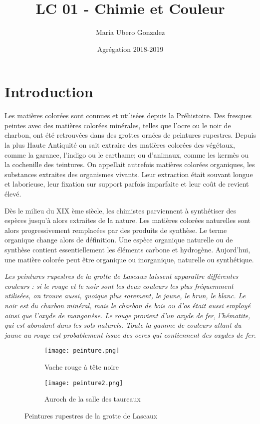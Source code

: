 \documentclass{article}
\title{LC 01 - Chimie et Couleur}
\author{Maria Ubero Gonzalez}
\date{Agrégation 2018-2019}
\begin{document}
\maketitle

\tableofcontents

\pagebreak

\section*{Introduction}
Les matières colorées sont connues et utilisées depuis la Préhistoire. Des fresques peintes avec des matières colorées minérales, telles que l'ocre ou le noir de charbon, ont été retrouvées dans des grottes ornées de peintures rupestres. Depuis la plus Haute Antiquité on sait extraire des matières colorées des végétaux, comme la garance, l'indigo ou le carthame; ou d'animaux, comme les kermès ou la cochenille des teintures. On appellait autrefois matières colorées organiques, les substances extraites des organismes vivants. Leur extraction était souvant longue et laborieuse, leur fixation sur support parfois imparfaite et leur coût de revient élevé.\smallskip

Dès le milieu du XIX ème siècle, les chimistes parviennent à synthétiser des espèces jusqu'à alors extraites de la nature. Les matières colorées naturelles sont alors progressivement remplacées par des produits de synthèse. Le terme organique change alors de définition. Une espèce organique naturelle ou de synthèse contient essentiellement les éléments carbone et hydrogène. Aujord'hui, une matière colorée peut être organique ou inorganique, naturelle ou synthétique.\medskip

\textit{Les peintures rupestres de la grotte de Lascaux laissent apparaître différentes couleurs : si le rouge et le noir sont
les deux couleurs les plus fréquemment utilisées, on trouve aussi, quoique plus rarement, le jaune, le brun, le
blanc. Le noir est du charbon minéral, mais le charbon de bois ou d’os était aussi employé ainsi que l’oxyde de
manganèse. Le rouge provient d’un oxyde de fer, l’hématite, qui est abondant dans les sols naturels. Toute la
gamme de couleurs allant du jaune au rouge est probablement issue des ocres qui contiennent des oxydes de fer.}

\begin{figure}[H]
\centering
\begin{subfigure}{.5\textwidth}
  \centering
  \texttt{[image: peinture.png]}
  \caption{Vache rouge à tête noire }
  \label{fig:sub1}
\end{subfigure}%
\begin{subfigure}{.5\textwidth}
  \centering
  \texttt{[image: peinture2.png]}
  \caption{Auroch de la salle des taureaux}
  \label{fig:sub2}
\end{subfigure}
\caption{Peintures rupestres de la grotte de Lascaux }
\label{fig:test}
\end{figure}
\end{document}
